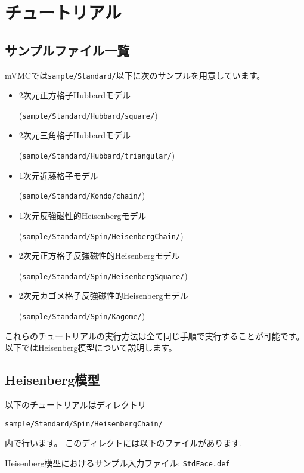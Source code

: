 \chapter{チュートリアル}
\label{Ch:model}

\section{サンプルファイル一覧}

mVMCでは\verb|sample/Standard/|以下に次のサンプルを用意しています。

\begin{itemize}
\item 2次元正方格子Hubbardモデル

  (\verb|sample/Standard/Hubbard/square/|)
\item 2次元三角格子Hubbardモデル

  (\verb|sample/Standard/Hubbard/triangular/|)
\item 1次元近藤格子モデル

  (\verb|sample/Standard/Kondo/chain/|)
\item 1次元反強磁性的Heisenbergモデル

  (\verb|sample/Standard/Spin/HeisenbergChain/|)
\item 2次元正方格子反強磁性的Heisenbergモデル

  (\verb|sample/Standard/Spin/HeisenbergSquare/|)
  
\item 2次元カゴメ格子反強磁性的Heisenbergモデル

  (\verb|sample/Standard/Spin/Kagome/|)

\end{itemize}

これらのチュートリアルの実行方法は全て同じ手順で実行することが可能です。
以下ではHeisenberg模型について説明します。


\section{Heisenberg模型}

以下のチュートリアルはディレクトリ
\begin{verbatim}
sample/Standard/Spin/HeisenbergChain/
\end{verbatim}
内で行います。
このディレクトには以下のファイルがあります.

Heisenberg模型におけるサンプル入力ファイル: \verb|StdFace.def|

